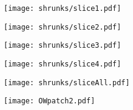 \begin{frame}
\begin{figure}
	\centering
	\texttt{[image: shrunks/slice1.pdf]}
\end{figure}
\end{frame}

\begin{frame}
\begin{figure}
	\centering
	\texttt{[image: shrunks/slice2.pdf]}
\end{figure}
\end{frame}

\begin{frame}
\begin{figure}
	\centering
	\texttt{[image: shrunks/slice3.pdf]}
\end{figure}
\end{frame}

\begin{frame}
\begin{figure}
	\centering
	\texttt{[image: shrunks/slice4.pdf]}
\end{figure}
\end{frame}

\begin{frame}
\begin{figure}
	\centering
	\texttt{[image: shrunks/sliceAll.pdf]}
\end{figure}
\end{frame}

\begin{frame}
\begin{figure}
	\centering
	\texttt{[image: OWpatch2.pdf]}
\end{figure}
\end{frame}


